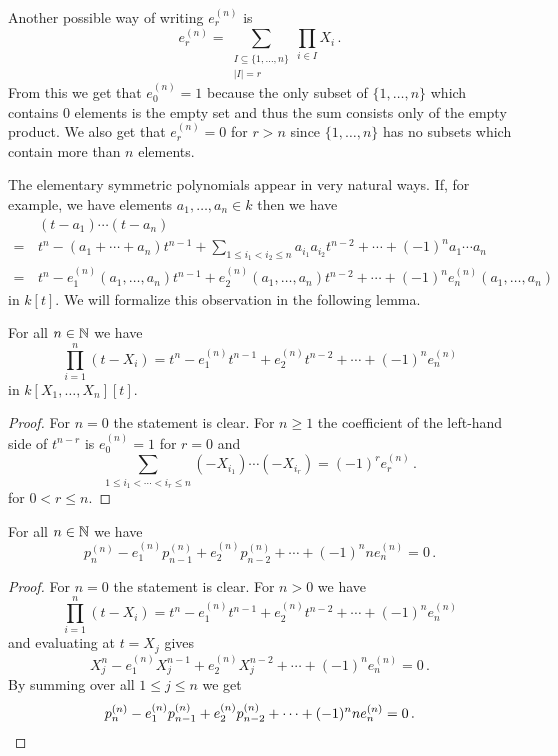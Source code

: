 Another possible way of writing $e^{(n)}_r$ is
\[
    e^{(n)}_r
  = \sum_{\substack{I \subseteq \{1, \dotsc, n\} \\ |I| = r}} \prod_{i \in I} X_i \,.
\]
From this we get that $e^{(n)}_0 = 1$ because the only subset of $\{1, \dotsc, n\}$ which contains $0$ elements is the empty set and thus the sum consists only of the empty product.
We also get that $e^{(n)}_r = 0$ for $r > n$ since $\{1, \dotsc, n\}$ has no subsets which contain more than $n$ elements.

The elementary symmetric polynomials appear in very natural ways.
If, for example, we have elements $a_1, \dotsc, a_n \in k$ then we have
\begin{align*}
   &\, (t-a_1) \dotsm (t-a_n) \\
  =&\, t^n - (a_1 + \dotsb + a_n) t^{n-1} + \sum_{1 \leq i_1 < i_2 \leq n} a_{i_1} a_{i_2} t^{n-2} + \dotsb + (-1)^n a_1 \dotsm a_n \\ 
  =&\, t^n - e^{(n)}_1(a_1, \dotsc, a_n) t^{n-1} + e^{(n)}_2(a_1, \dotsc, a_n) t^{n-2} + \dotsb + (-1)^n e^{(n)}_n(a_1, \dotsc, a_n)
\end{align*}
in $k[t]$.
We will formalize this observation in the following lemma.


\begin{lemma}
  For all $n \in \mathbb{N}$ we have
  \[
      \prod_{i=1}^n (t-X_i)
    = t^n - e^{(n)}_1 t^{n-1} + e^{(n)}_2 t^{n-2} + \dotsb + (-1)^n e^{(n)}_n
  \]
  in $k[X_1, \dotsc, X_n][t]$.
\end{lemma}
\begin{proof}
  For $n = 0$ the statement is clear.
  For $n \geq 1$ the coefficient of the left-hand side of $t^{n-r}$ is $e^{(n)}_0 = 1$ for $r = 0$ and
  \[
      \sum_{1 \leq i_1 < \dotsb < i_r \leq n} (-X_{i_1}) \dotsm (-X_{i_r})
    = (-1)^r e^{(n)}_r \,.
  \]
  for $0 < r \leq n$.
\end{proof}


\begin{corollary}
  For all $n \in \mathbb{N}$ we have
  \[
      p^{(n)}_n - e^{(n)}_1 p^{(n)}_{n-1} + e^{(n)}_2 p^{(n)}_{n-2} + \dotsb + (-1)^n n e^{(n)}_n
    = 0 \,.
  \]
\end{corollary}
\begin{proof}
  For $n = 0$ the statement is clear. For $n > 0$ we have
  \[
      \prod_{i=1}^n (t-X_i)
    = t^n - e^{(n)}_1 t^{n-1} + e^{(n)}_2 t^{n-2} + \dotsb + (-1)^n e^{(n)}_n
  \]
  and evaluating at $t = X_j$ gives
  \[
      X_j^n - e^{(n)}_1 X_j^{n-1} + e^{(n)}_2 X_j^{n-2} + \dotsb + (-1)^n e^{(n)}_n
    = 0 \,.
  \]
  By summing over all $1 \leq j \leq n$ we get
  \[
      p^{(n)}_n - e^{(n)}_1 p^{(n)}_{n-1} + e^{(n)}_2 p^{(n)}_{n-2} + \dotsb + (-1)^n n e^{(n)}_n
    = 0 \,.
    \qedhere
  \]
\end{proof}


